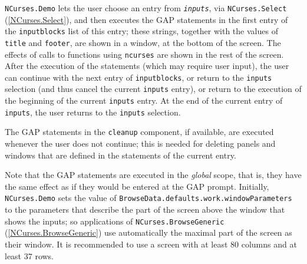 \documentclass[a4paper,11pt]{report}
\begin{document}
{{{ \texttt{NCurses.Demo} lets the user choose an entry from \mbox{\texttt{\mdseries\slshape inputs}}, via \texttt{NCurses.Select} (\ref{NCurses.Select}), and then executes the \textsf{GAP} statements in the first entry of the \texttt{inputblocks} list of this entry; these strings, together with the values of \texttt{title} and \texttt{footer}, are shown in a window, at the bottom of the screen. The effects of calls to
functions using \texttt{ncurses} are shown in the rest of the screen. After the execution of the statements
(which may require user input), the user can continue with the next entry of \texttt{inputblocks}, or return to the \texttt{inputs} selection (and thus cancel the current \texttt{inputs} entry), or return to the execution of the beginning of the current \texttt{inputs} entry. At the end of the current entry of \texttt{inputs}, the user returns to the \texttt{inputs} selection. 

 The \textsf{GAP} statements in the \texttt{cleanup} component, if available, are executed whenever the user does not continue;
this is needed for deleting panels and windows that are defined in the
statements of the current entry. 

 Note that the \textsf{GAP} statements are executed in the \emph{global} scope, that is, they have the same effect as if they would be entered at the \textsf{GAP} prompt. Initially, \texttt{NCurses.Demo} sets the value of \texttt{BrowseData.defaults.work.windowParameters} to the parameters that describe the part of the screen above the window that
shows the inputs; so applications of \texttt{NCurses.BrowseGeneric} (\ref{NCurses.BrowseGeneric}) use automatically the maximal part of the screen as their window. It is
recommended to use a screen with at least $80$ columns and at least $37$ rows. }

 }

 }

 
\end{document}
